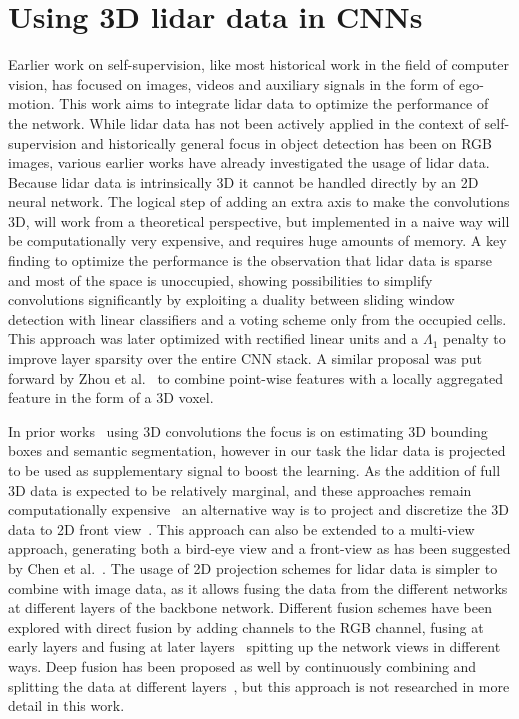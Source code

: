 \section{Using 3D lidar data in CNNs}
Earlier work on self-supervision, like most historical work in the field of computer vision, has focused on images, videos and auxiliary signals in the form of ego-motion. This work aims to integrate lidar data to optimize the performance of the network. While lidar data has not been actively applied in the context of self-supervision and historically general focus in object detection has been on RGB images, various earlier works have already investigated the usage of lidar data. Because lidar data is intrinsically 3D it cannot be handled directly by an 2D neural network. The logical step of adding an extra axis to make the convolutions 3D, will work from a theoretical perspective, but implemented in a naive way will be computationally very expensive, and requires huge amounts of memory. A key finding to optimize the performance is the observation that lidar data is sparse and most of the space is unoccupied\cite{wang2015vote}, showing possibilities to simplify convolutions significantly by exploiting a duality between sliding window detection with linear classifiers and a voting scheme only from the occupied cells. This approach was later optimized with rectified linear units and a $\Lambda_1$ penalty to improve layer sparsity over the entire CNN stack\cite{engelcke2017}. A similar proposal was put forward by Zhou et al.~\cite{zhou2017voxelnet} to combine point-wise features with a locally aggregated feature in the form of a 3D voxel. 

In prior works~\cite{engelcke2017,zhou2017voxelnet,wang2015} using 3D convolutions the focus is on estimating 3D bounding boxes and semantic segmentation, however in our task the lidar data is projected to be used as supplementary signal to boost the learning. As the addition of full 3D data is expected to be relatively marginal, and these approaches remain computationally expensive~\cite{chen2017} an alternative way is to project and discretize the 3D data to 2D front view~\cite{li2016}. This approach can also be extended to a multi-view approach, generating both a bird-eye view and a front-view as has been suggested by Chen et al.~\cite{chen2017}. The usage of 2D projection schemes for lidar data is simpler to combine with image data, as it allows fusing the data from the different networks at different layers of the backbone network. Different fusion schemes have been explored with direct fusion by adding channels to the RGB channel, fusing at early layers and fusing at later layers~\cite{schlosser2016} spitting up the network views in different ways. Deep fusion has been proposed as well by continuously combining and splitting the data at different layers~\cite{chen2017}, but this approach is not researched in more detail in this work.

